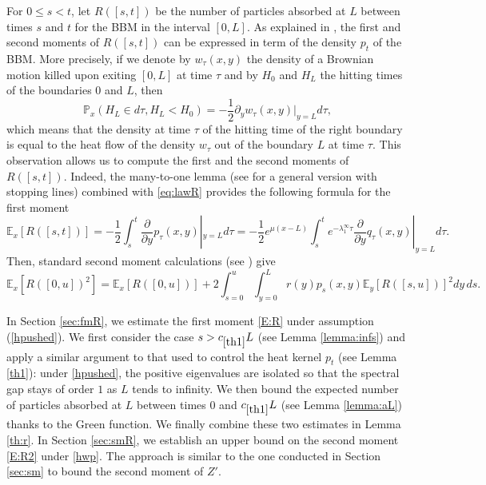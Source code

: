 \documentclass[11pt]{article}
\theoremstyle{plain}
\newcommand\linf{\lambda_1^\infty}
\begin{document}
For $0\leqslant s< t$, let $R([s,t])$ be the number of particles absorbed at $L$ between times $s$ and $t$ for the BBM in the interval $[0,L]$. As explained in \cite[Lemma 5.7]{Maillard:2020aa}, the first and second moments  of $R([s,t])$ can be expressed in term of the density $p_t$ of the BBM. More precisely, if we denote by $w_\tau(x,y)$ the density of a Brownian motion killed upon exiting $[0,L]$ at time $\tau$ and  by $H_0$ and $H_L$ the hitting times of the boundaries $0$ and $L$, then
\begin{equation}
\mathbb{P}_x\left(H_L\in d\tau, H_L<H_0\right)=-\frac{1}{2}\partial_y w_\tau(x,y)\big |_{y=L}d\tau, \label{eq:lawR}
\end{equation} 
which means that the density at time $\tau$ of the hitting time of the right boundary is equal to the heat flow of the density $w_\tau$ out of the boundary $L$ at time $\tau$. This observation allows us to compute the first and the second moments of $R([s,t])$. Indeed, the many-to-one lemma (see \cite{Maillard:2016uw} for a general version with stopping lines) combined with \eqref{eq:lawR} provides the following formula for the first moment
\begin{equation}
\mathbb{E}_x[R([s,t])]=-\frac{1}{2}\int_s^t \frac{\partial}{\partial y}p_\tau(x,y)|_{y=L}d\tau=-\frac{1}{2}e^{\mu(x-L)}\int_{s}^te^{-\linf \tau}\frac{\partial}{\partial y}q_\tau(x,y)|_{y=L}d\tau.\label{E:R}
\end{equation}
Then, standard second moment calculations (see \cite[Theorem 4.15]{Ikeda:1969tj}) give
\begin{equation}
\mathbb{E}_x\left[R([0,u])^2\right]=\mathbb{E}_x\left[R([0,u])\right]+2\int_{s=0}^u\int_{y=0}^L r(y)p_s(x,y)\mathbb{E}_y\left[R([s,u])\right]^2dy\,ds. \label{E:R2}
\end{equation}

In Section \ref{sec:fmR}, we estimate the first moment \eqref{E:R} under assumption (\ref{hpushed}).  We first consider the case  $s>c_{\ref{th1}}L$ (see Lemma \ref{lemma:infs}) and apply a similar argument  to that used to control the heat kernel $p_t$ (see Lemma \ref{th1}): under \eqref{hpushed}, the positive eigenvalues are isolated so that the spectral gap stays of order $1$ as $L$ tends to infinity.  We then bound the expected number of particles absorbed at $L$ between times 0 and $c_{\ref{th1}}L$ (see Lemma \ref{lemma:aL}) thanks to the Green function. We finally combine these two estimates in Lemma \ref{th:r}.
In Section \ref{sec:smR}, we establish an upper bound on the second moment \eqref{E:R2} under \eqref{hwp}. The approach is similar to the one conducted in Section \ref{sec:sm} to bound the second moment of $Z'$. %
\end{document}
